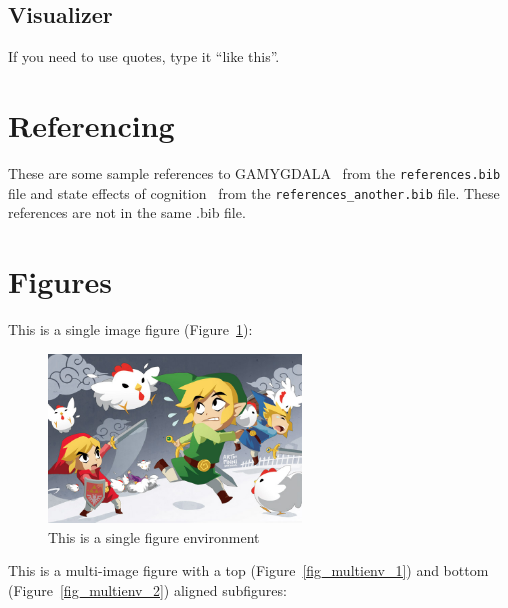 \subsection{Visualizer}\label{subsec:component-visualizer}

If you need to use quotes, type it ``like this''.

\section{Referencing}
These are some sample references to GAMYGDALA~\citep{popescu2014gamygdala} from 
the \texttt{references.bib} file and state effects of 
cognition~\citep{hudlicka2002time} from the \texttt{references\_another.bib} 
file. These references are not in the same .bib file.

\section{Figures}
This is a single image figure (Figure~\ref{fig_singleenv}):

\begin{figure}[ht]
    \centering
    \includegraphics[width=0.6\textwidth]{figures/Sample/tumblr_static_eaceks0rfxsss8o4swscw40wo.jpg}
    \caption[Single Figure Environment Listed Title]{This is a single figure 
    environment}
    \label{fig_singleenv}
\end{figure}

This is a multi-image figure with a top (Figure~\ref{fig_multienv_1}) and bottom (Figure~\ref{fig_multienv_2}) aligned subfigures:

